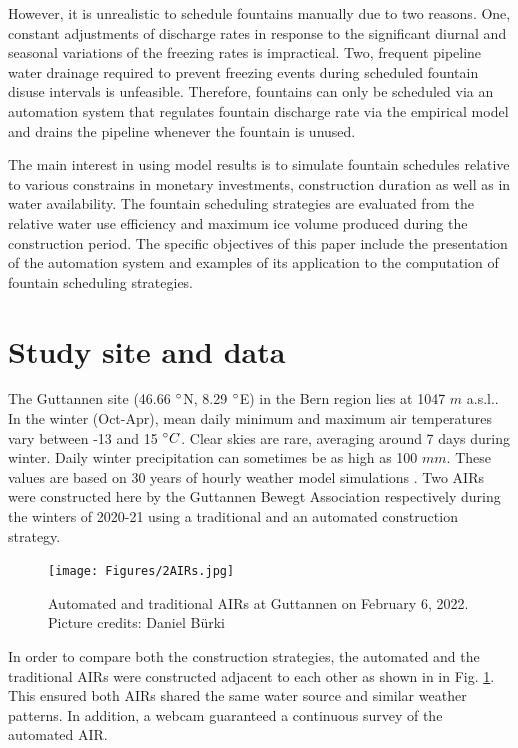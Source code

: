 \documentclass[tc, manuscript]{copernicus}
\begin{document}
However, it is unrealistic to schedule fountains manually due to two reasons. One, constant adjustments of
discharge rates in response to the significant diurnal and seasonal variations of the freezing rates is
impractical. Two, frequent pipeline water drainage required to prevent freezing events during scheduled fountain
disuse intervals is unfeasible. Therefore, fountains can only be scheduled via an automation system that
regulates fountain discharge rate via the empirical model and drains the pipeline whenever the fountain is
unused.

The main interest in using model results is to simulate fountain schedules relative to various constrains in
monetary investments, construction duration as well as in water availability. The fountain scheduling strategies
are evaluated from the relative water use efficiency and maximum ice volume produced during the construction
period. The specific objectives of this paper include the presentation of the automation system and examples of
its application to the computation of fountain scheduling strategies.

\section{Study site and data}

The Guttannen site (46.66 $^{\circ}$N, 8.29 $^{\circ}$E) in the Bern region lies at 1047 $m$ a.s.l.. In the winter
(Oct-Apr), mean daily minimum and maximum air temperatures vary between -13 and 15 $^{\circ} C$. Clear skies are
rare, averaging around 7 days during winter. Daily winter precipitation can sometimes be as high as 100 $mm$.
These values are based on 30 years of hourly weather model simulations \citep{guttannen}. Two AIRs were
constructed here by the Guttannen Bewegt Association respectively during the winters of 2020-21 using a
traditional and an automated construction strategy.

\begin{figure}[t]
\texttt{[image: Figures/2AIRs.jpg]}
\caption{Automated and traditional AIRs  at Guttannen on February 6, 2022. Picture credits: Daniel Bürki}
\label{fig:2AIR} 
\end{figure}

In order to compare both the construction strategies, the automated and the traditional AIRs were constructed
adjacent to each other as shown in in Fig. \ref{fig:2AIR}. This ensured both AIRs shared the same water source
and similar weather patterns. In addition, a webcam guaranteed a continuous survey of the automated AIR.   
\end{document}
